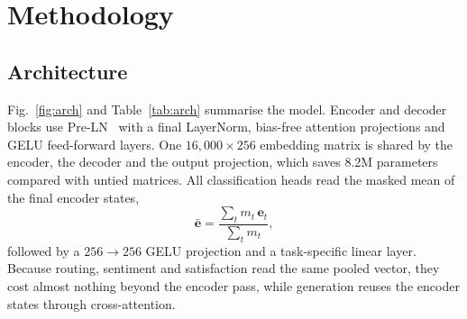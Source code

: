 \documentclass[conference]{IEEEtran}
\begin{document}
\section{Methodology}

\subsection{Architecture}
Fig.~\ref{fig:arch} and Table~\ref{tab:arch} summarise the model. Encoder and decoder blocks use Pre-LN~\cite{xiong2020layer} with a final LayerNorm, bias-free attention projections and GELU feed-forward layers. One $16{,}000\times256$ embedding matrix is shared by the encoder, the decoder and the output projection, which saves 8.2M parameters compared with untied matrices. All classification heads read the masked mean of the final encoder states,
\begin{equation}
\bar{\mathbf{e}}=\frac{\sum_{t} m_t\,\mathbf{e}_t}{\sum_t m_t},
\end{equation}
followed by a $256\to256$ GELU projection and a task-specific linear layer. Because routing, sentiment and satisfaction read the same pooled vector, they cost almost nothing beyond the encoder pass, while generation reuses the encoder states through cross-attention.


\end{document}
